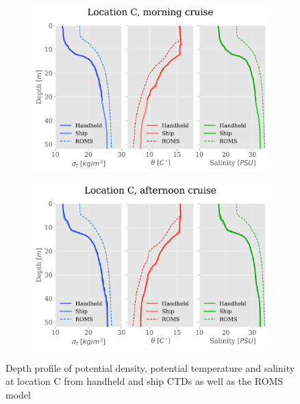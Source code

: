\documentclass[a4paper,10pt,english]{article}
\begin{document}
\begin{figure}[H]
    \begin{adjustwidth}{-2.5cm}{-2.5cm}  %
    \begin{subfigure}{0.65\textwidth}
            \centering
            \includegraphics[width=1.\linewidth]{../figures/combined_profiles/Location_C_morning_cruise.png}
            \caption{}
            \label{fig:morning_C}
    \end{subfigure}%
    \begin{subfigure}{0.65\textwidth}
            \centering
            \includegraphics[width=1.\linewidth]{../figures/combined_profiles/Location_C_afternoon_cruise.png}
            \caption{}
            \label{fig:afternoon_C}
    \end{subfigure}
    \end{adjustwidth}
    
    \caption{Depth profile of potential density, potential temperature and salinity at location C from handheld and ship CTDs as well as the ROMS model}
    \label{fig:location_C}
\end{figure}
\end{document}
